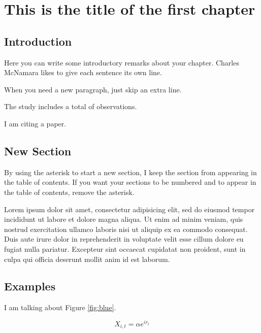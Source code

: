 	\chapter{This is the title of the first chapter}
	\newpage


\section{Introduction}

Here you can write some introductory remarks about your chapter.
Charles McNamara likes to give each sentence its own line.

When you need a new paragraph, just skip an extra line.

The study includes a total of \totalN observations.

I am citing a paper\cite{citkey}.

\section*{New Section}

By using the asterisk to start a new section, I keep the section from appearing in the table of contents.
If you want your sections to be numbered and to appear in the table of contents, remove the asterisk.

Lorem ipsum dolor sit amet, consectetur adipisicing elit, sed do eiusmod tempor incididunt ut labore et dolore magna aliqua. Ut enim ad minim veniam, quis nostrud exercitation ullamco laboris nisi ut aliquip ex ea commodo consequat. Duis aute irure dolor in reprehenderit in voluptate velit esse cillum dolore eu fugiat nulla pariatur. Excepteur sint occaecat cupidatat non proident, sunt in culpa qui officia deserunt mollit anim id est laborum.

\section{Examples}
I am talking about Figure \ref{fig:blue}.

\begin{equation}
	X_{i,t}=\alpha e^{ir_t}
\end{equation}


